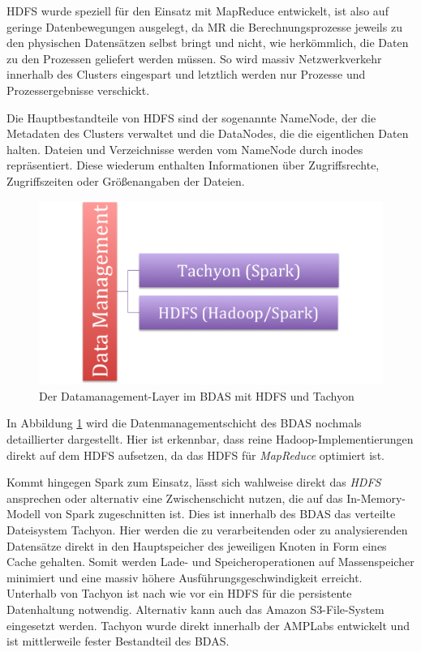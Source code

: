 HDFS wurde speziell für den Einsatz mit MapReduce entwickelt, ist also auf geringe Datenbewegungen ausgelegt, da MR die Berechnungsprozesse jeweils zu den physischen Datensätzen selbst bringt und nicht, wie herkömmlich, die Daten zu den Prozessen geliefert werden müssen. So wird massiv Netzwerkverkehr innerhalb des Clusters eingespart und letztlich werden nur Prozesse und Prozessergebnisse verschickt.  

Die Hauptbestandteile von HDFS sind der sogenannte NameNode, der die Metadaten des Clusters verwaltet und die DataNodes, die die eigentlichen Daten halten. Dateien und Verzeichnisse werden vom NameNode durch inodes repräsentiert. Diese wiederum enthalten Informationen über Zugriffsrechte, Zugriffszeiten oder Größenangaben der Dateien.



\begin{figure}[htb!] 
\centering
\includegraphics[width=1.0\textwidth]{bilder/2_3_stack.png}
\caption{Der Datamanagement-Layer im BDAS mit HDFS und Tachyon}
\label{fig:datamgmtlayer}
\end{figure} 

 

In Abbildung \ref{fig:datamgmtlayer} wird die Datenmanagementschicht des BDAS nochmals detaillierter dargestellt. Hier ist erkennbar, dass reine Hadoop-Implementierungen direkt auf dem HDFS aufsetzen, da das HDFS für \textit{MapReduce} optimiert ist. 

Kommt hingegen Spark zum Einsatz, lässt sich wahlweise direkt das \textit{HDFS} ansprechen oder alternativ eine Zwischenschicht nutzen, die auf das In-Memory-Modell von Spark zugeschnitten ist. Dies ist innerhalb des BDAS das verteilte Dateisystem Tachyon. Hier werden die zu verarbeitenden oder zu analysierenden Datensätze direkt in den Hauptspeicher des jeweiligen Knoten in Form eines Cache gehalten. Somit werden Lade- und Speicheroperationen auf Massenspeicher minimiert und eine massiv höhere Ausführungsgeschwindigkeit erreicht. Unterhalb von Tachyon ist nach wie vor ein HDFS für die persistente Datenhaltung notwendig. Alternativ kann auch das Amazon S3-File-System eingesetzt werden. Tachyon wurde direkt innerhalb der AMPLabs entwickelt und ist mittlerweile fester Bestandteil des BDAS.  


